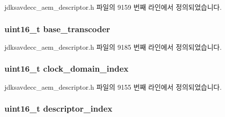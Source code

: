 jdksavdecc\+\_\+aem\+\_\+descriptor.\+h 파일의 9159 번째 라인에서 정의되었습니다.

\subsubsection[{\texorpdfstring{base\+\_\+transcoder}{base_transcoder}}]{\setlength{\rightskip}{0pt plus 5cm}uint16\+\_\+t base\+\_\+transcoder}\hypertarget{structjdksavdecc__descriptor__video__unit_ac7e02a98f43dc72d6384a6635fbaf944}{}\label{structjdksavdecc__descriptor__video__unit_ac7e02a98f43dc72d6384a6635fbaf944}


jdksavdecc\+\_\+aem\+\_\+descriptor.\+h 파일의 9185 번째 라인에서 정의되었습니다.

\subsubsection[{\texorpdfstring{clock\+\_\+domain\+\_\+index}{clock_domain_index}}]{\setlength{\rightskip}{0pt plus 5cm}uint16\+\_\+t clock\+\_\+domain\+\_\+index}\hypertarget{structjdksavdecc__descriptor__video__unit_a6608f023d147b556a49527d568abed8e}{}\label{structjdksavdecc__descriptor__video__unit_a6608f023d147b556a49527d568abed8e}


jdksavdecc\+\_\+aem\+\_\+descriptor.\+h 파일의 9155 번째 라인에서 정의되었습니다.

\subsubsection[{\texorpdfstring{descriptor\+\_\+index}{descriptor_index}}]{\setlength{\rightskip}{0pt plus 5cm}uint16\+\_\+t descriptor\+\_\+index}\hypertarget{structjdksavdecc__descriptor__video__unit_a042bbc76d835b82d27c1932431ee38d4}{}\label{structjdksavdecc__descriptor__video__unit_a042bbc76d835b82d27c1932431ee38d4}


